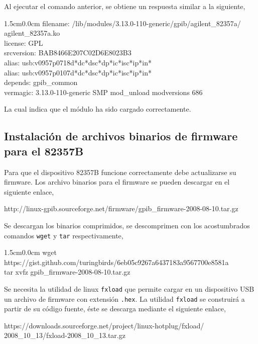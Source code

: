 \documentclass[paper=letter,oneside,fontsize=11pt, parskip=full]{scrartcl}
\newenvironment{code}
	{\begin{adjustwidth}{1.5cm}{0.0cm}\ttfamily}
	{\end{adjustwidth}}
\newenvironment{link}
	{\ttfamily}{}
\begin{document}
		Al ejecutar el comando anterior, se obtiene un respuesta similar a la siguiente,
		
		\begin{code}
			filename:    /lib/modules/3.13.0-110-generic/gpib/agilent\_82357a/ \\ agilent\_82357a.ko \\
			license:        GPL \\
			srcversion:     BAB8466E207C02D6E8023B3 \\
			alias:          usb:v0957p0718d*dc*dsc*dp*ic*isc*ip*in* \\
			alias:          usb:v0957p0107d*dc*dsc*dp*ic*isc*ip*in* \\
			depends:        gpib\_common \\
			vermagic:       3.13.0-110-generic SMP mod\_unload  modversions 686 
		\end{code}
	
		La cual indica que el módulo ha sido cargado correctamente.
		
		\subsection{Instalación de archivos binarios de firmware para el 82357B}	
		
		
		Para que el dispositivo 82357B funcione correctamente debe actualizarse su firmware. Los archivo binarios para el firmware se pueden descargar en el siguiente enlace, 
		
		\begin{link}
			http://linux-gpib.sourceforge.net/firmware/gpib\_firmware-2008-08-10.tar.gz
		\end{link}
	
		Se descargan los binarios comprimidos, se descomprimen con los acostumbrados comandos \texttt{wget} y \texttt{tar} respectivamente,
		
		\begin{code}
			wget https://gist.github.com/turingbirds/6eb05c9267a6437183a9567700e8581a \\ 		
			tar xvfz gpib\_firmware-2008-08-10.tar.gz 
		\end{code}
		
		Se necesita la utilidad de linux \texttt{fxload} que permite cargar en un dispositivo USB un archivo de firmware con extensión \texttt{.hex}. La utilidad \texttt{fxload} se construirá a partir de su código fuente, éste se descarga mediante el siguiente enlace,
		
		\begin{link}		
			https://downloads.sourceforge.net/project/linux-hotplug/fxload/ \\ 2008\_10\_13/fxload-2008\_10\_13.tar.gz		
		\end{link}
		
\end{document}
